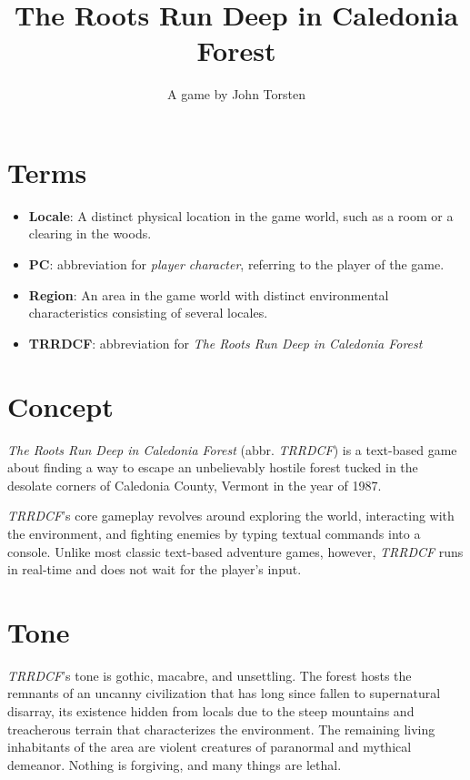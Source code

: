 \documentclass[11pt]{article}
\title{The Roots Run Deep in Caledonia Forest}
\author{A game by John Torsten}
\begin{document}
	\maketitle
	\tableofcontents
	\clearpage

	\section{Terms}
	
	\begin{itemize}
		\item \textbf{Locale}: A distinct physical location in the game world, such as a room or a clearing in the woods.
		\item \textbf{PC}: abbreviation for \textit{player character}, referring to the player of the game.
		\item \textbf{Region}: An area in the game world with distinct environmental characteristics consisting of several locales.
		\item \textbf{TRRDCF}: abbreviation for \textit{The Roots Run Deep in Caledonia Forest}
	\end{itemize}
	
	
	\section{Concept}
	
	\textit{The Roots Run Deep in Caledonia Forest} (abbr. \textit{TRRDCF}) is a text-based game about finding a way to escape an unbelievably hostile forest tucked in the desolate corners of Caledonia County, Vermont in the year of 1987.
	
	\textit{TRRDCF}'s core gameplay revolves around exploring the world, interacting with the environment, and fighting enemies by typing textual commands into a console. Unlike most classic text-based adventure games, however, \textit{TRRDCF} runs in real-time and does not wait for the player's input.
	
	\section{Tone}
	
	\textit{TRRDCF}'s tone is gothic, macabre, and unsettling. The forest hosts the remnants of an uncanny civilization that has long since fallen to supernatural disarray, its existence hidden from locals due to the steep mountains and treacherous terrain that characterizes the environment. The remaining living inhabitants of the area are violent creatures of paranormal and mythical demeanor. Nothing is forgiving, and many things are lethal.
	
\end{document}
